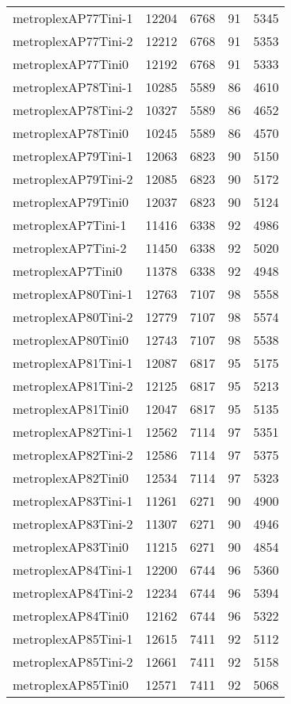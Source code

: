 \begin{longtable}{lrrrr}
metroplexAP77Tini-1 & 12204 & 6768 & 91 & 5345 \\
metroplexAP77Tini-2 & 12212 & 6768 & 91 & 5353 \\
metroplexAP77Tini0 & 12192 & 6768 & 91 & 5333 \\
metroplexAP78Tini-1 & 10285 & 5589 & 86 & 4610 \\
metroplexAP78Tini-2 & 10327 & 5589 & 86 & 4652 \\
metroplexAP78Tini0 & 10245 & 5589 & 86 & 4570 \\
metroplexAP79Tini-1 & 12063 & 6823 & 90 & 5150 \\
metroplexAP79Tini-2 & 12085 & 6823 & 90 & 5172 \\
metroplexAP79Tini0 & 12037 & 6823 & 90 & 5124 \\
metroplexAP7Tini-1 & 11416 & 6338 & 92 & 4986 \\
metroplexAP7Tini-2 & 11450 & 6338 & 92 & 5020 \\
metroplexAP7Tini0 & 11378 & 6338 & 92 & 4948 \\
metroplexAP80Tini-1 & 12763 & 7107 & 98 & 5558 \\
metroplexAP80Tini-2 & 12779 & 7107 & 98 & 5574 \\
metroplexAP80Tini0 & 12743 & 7107 & 98 & 5538 \\
metroplexAP81Tini-1 & 12087 & 6817 & 95 & 5175 \\
metroplexAP81Tini-2 & 12125 & 6817 & 95 & 5213 \\
metroplexAP81Tini0 & 12047 & 6817 & 95 & 5135 \\
metroplexAP82Tini-1 & 12562 & 7114 & 97 & 5351 \\
metroplexAP82Tini-2 & 12586 & 7114 & 97 & 5375 \\
metroplexAP82Tini0 & 12534 & 7114 & 97 & 5323 \\
metroplexAP83Tini-1 & 11261 & 6271 & 90 & 4900 \\
metroplexAP83Tini-2 & 11307 & 6271 & 90 & 4946 \\
metroplexAP83Tini0 & 11215 & 6271 & 90 & 4854 \\
metroplexAP84Tini-1 & 12200 & 6744 & 96 & 5360 \\
metroplexAP84Tini-2 & 12234 & 6744 & 96 & 5394 \\
metroplexAP84Tini0 & 12162 & 6744 & 96 & 5322 \\
metroplexAP85Tini-1 & 12615 & 7411 & 92 & 5112 \\
metroplexAP85Tini-2 & 12661 & 7411 & 92 & 5158 \\
metroplexAP85Tini0 & 12571 & 7411 & 92 & 5068 \\

\end{longtable}
